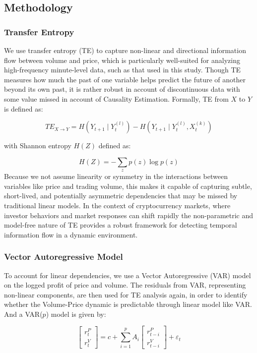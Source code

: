 \documentclass{article}
\begin{document}
\subsection{Methodology}
\subsubsection{Transfer Entropy}
We use transfer entropy (TE) to capture non-linear and directional information flow between volume and price, which is particularly well-suited for analyzing high-frequency minute-level data, such as that used in this study. Though TE measures how much the past of one variable helps predict the future of another beyond its own past, it is rather robust in account of discontinuous data with some value missed in account of Causality Estimation. Formally, TE from $X$ to $Y$ is defined as:

\begin{equation}
TE_{X \rightarrow Y} = H(Y_{t+1} \mid Y_t^{(l)}) - H(Y_{t+1} \mid Y_t^{(l)}, X_t^{(k)})
\end{equation}

with Shannon entropy $H(Z)$ defined as:

\begin{equation}
H(Z) = -\sum_{z} p(z) \log p(z)
\end{equation}
Because we not assume linearity or symmetry in the interactions between variables like price and trading volume, this makes it capable of capturing subtle, short-lived, and potentially asymmetric dependencies that may be missed by traditional linear models. In the context of cryptocurrency markets, where investor behaviors and market responses can shift rapidly the non-parametric and model-free nature of TE provides a robust framework for detecting temporal information flow in a dynamic environment.
    
\subsubsection{Vector Autoregressive Model}
To account for linear dependencies, we use a Vector Autoregressive (VAR) model on the logged profit of price and volume. The residuals from VAR, representing non-linear components, are then used for TE analysis again, in order to identify whether the Volume-Price dynamic is predictable through linear model like VAR. And a VAR($p$) model is given by:

\begin{equation}
\begin{bmatrix}
r_t^P \\
r_t^V
\end{bmatrix}
=
c + \sum_{i=1}^{p} A_i
\begin{bmatrix}
r_{t-i}^P \\
r_{t-i}^V
\end{bmatrix}
+ \varepsilon_t
\end{equation}
\end{document}
